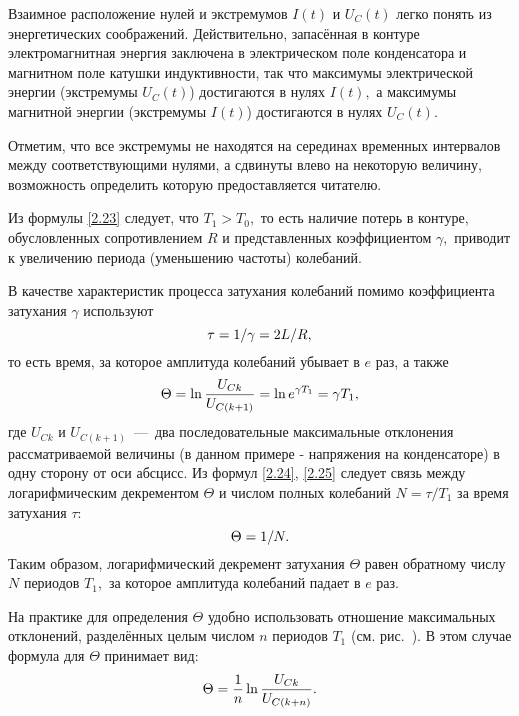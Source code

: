 Взаимное расположение нулей и экстремумов $I(t)$ и $U_C(t)$ легко понять из энергетических соображений. Действительно, запасённая в контуре электромагнитная энергия заключена в электрическом поле конденсатора и магнитном поле катушки индуктивности, так что максимумы электрической энергии (экстремумы $U_C(t)$) достигаются в нулях $I(t),$ а максимумы магнитной энергии (экстремумы $I(t)$) достигаются в нулях $U_C(t).$

Отметим, что все экстремумы не находятся на серединах временных интервалов между соответствующими нулями, а сдвинуты влево на некоторую величину, возможность определить которую предоставляется читателю.

Из формулы \eqref{2.23} следует, что $T_1>T_0,$ то есть наличие потерь в контуре, обусловленных сопротивлением $R$ и представленных коэффициентом $\gamma,$ приводит к увеличению периода (уменьшению частоты) колебаний.

В качестве характеристик процесса затухания колебаний помимо коэффициента затухания $\gamma$ используют 
\begin{equation}\eqmark{2.24}
\tau=1/\gamma=2L/R,
\end{equation}
то есть время, за которое амплитуда колебаний убывает в $e$ раз, а также 
\begin{equation}\eqmark{2.25}
\Theta=\ln\dfrac{U_{Ck}}{U_{C(k+1)}}=\ln e^{\gamma T_1}=\gamma T_1,
\end{equation}
где $U_{Ck}$ и $U_{C(k+1)}$~---~два последовательные максимальные отклонения рассматриваемой величины (в данном примере - напряжения на конденсаторе) в одну сторону от оси абсцисс. Из формул \eqref{2.24}, \eqref{2.25} следует связь между логарифмическим декрементом $\Theta$ и числом полных колебаний $N=\tau/T_1$ за время затухания $\tau:$
\begin{equation}\eqmark{2.26}
\Theta=1/N.
\end{equation}
Таким образом, логарифмический декремент затухания $\Theta$ равен обратному числу $N$ периодов  $T_1,$ за которое амплитуда колебаний падает в $e$ раз.
 
На практике для определения $\Theta$ удобно использовать отношение максимальных отклонений, разделённых целым числом $n$ периодов $T_1$ (см. рис.~). В этом случае формула для $\Theta$ принимает вид:
\begin{equation}\eqmark{2.27}
\Theta=\dfrac{1}{n}\ln\dfrac{U_{Ck}}{U_{C(k+n)}}.
\end{equation}

